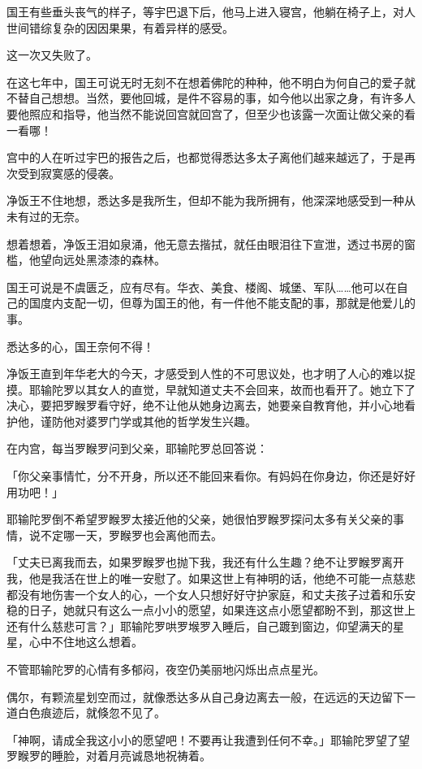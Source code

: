 \documentclass[12pt,twoside,openany]{book}
\begin{document}
国王有些垂头丧气的样子，等宇巴退下后，他马上进入寝宫，他躺在椅子上，对人世间错综复杂的因因果果，有着异样的感受。

这一次又失败了。

在这七年中，国王可说无时无刻不在想着佛陀的种种，他不明白为何自己的爱子就不替自己想想。当然，要他回城，是件不容易的事，如今他以出家之身，有许多人要他照应和指导，他当然不能说回宫就回宫了，但至少也该露一次面让做父亲的看一看哪！

宫中的人在听过宇巴的报告之后，也都觉得悉达多太子离他们越来越远了，于是再次受到寂寞感的侵袭。

净饭王不住地想，悉达多是我所生，但却不能为我所拥有，他深深地感受到一种从未有过的无奈。

想着想着，净饭王泪如泉涌，他无意去揩拭，就任由眼泪往下宣泄，透过书房的窗槛，他望向远处黑漆漆的森林。

国王可说是不虞匮乏，应有尽有。华衣、美食、楼阁、城堡、军队……他可以在自己的国度内支配一切，但尊为国王的他，有一件他不能支配的事，那就是他爱儿的事。

悉达多的心，国王奈何不得！

净饭王直到年华老大的今天，才感受到人性的不可思议处，也才明了人心的难以捉摸。耶输陀罗以其女人的直觉，早就知道丈夫不会回来，故而也看开了。她立下了决心，要把罗睺罗看守好，绝不让他从她身边离去，她要亲自教育他，并小心地看护他，谨防他对婆罗门学或其他的哲学发生兴趣。

在内宫，每当罗睺罗问到父亲，耶输陀罗总回答说：

「你父亲事情忙，分不开身，所以还不能回来看你。有妈妈在你身边，你还是好好用功吧！」

耶输陀罗倒不希望罗睺罗太接近他的父亲，她很怕罗睺罗探问太多有关父亲的事情，说不定哪一天，罗睺罗也会离他而去。

「丈夫已离我而去，如果罗睺罗也抛下我，我还有什么生趣？绝不让罗睺罗离开我，他是我活在世上的唯一安慰了。如果这世上有神明的话，他绝不可能一点慈悲都没有地伤害一个女人的心，一个女人只想好好守护家庭，和丈夫孩子过着和乐安稳的日子，她就只有这么一点小小的愿望，如果连这点小愿望都盼不到，那这世上还有什么慈悲可言？」耶输陀罗哄罗堠罗入睡后，自己踱到窗边，仰望满天的星星，心中不住地这么想着。

不管耶输陀罗的心情有多郁闷，夜空仍美丽地闪烁出点点星光。

偶尔，有颗流星划空而过，就像悉达多从自己身边离去一般，在远远的天边留下一道白色痕迹后，就倏忽不见了。

「神啊，请成全我这小小的愿望吧！不要再让我遭到任何不幸。」耶输陀罗望了望罗睺罗的睡脸，对着月亮诚恳地祝祷着。
\end{document}
